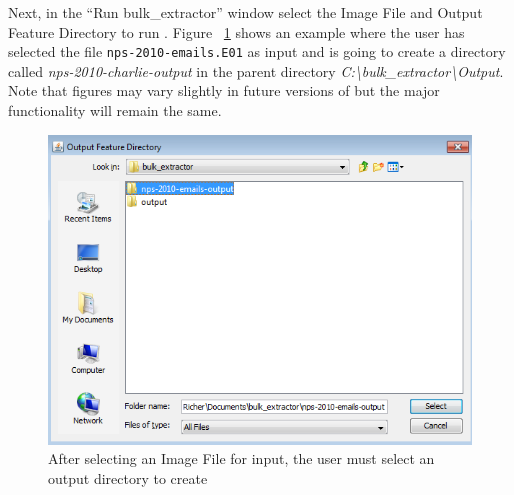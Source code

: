\documentclass[11pt]{article} %
\begin{document}
Next, in the ``Run bulk\_extractor'' window select the Image File and Output Feature Directory to run \bulk. Figure ~\ref{fig:selectOutputDirectory} shows an example where the user has selected the file \texttt{nps-2010-emails.E01} as input and is going to create a directory called \textit{nps-2010-charlie-output} in the parent directory \textit{C:\textbackslash bulk\_extractor\textbackslash Output}. Note that figures may vary slightly in future versions of \bulk but the major functionality will remain the same.\\
\begin{figure}
    \includegraphics[scale=.8]{viewerPics/selectOutputDirectory.png}
	\caption{After selecting an Image File for input, the user must select an output directory to create}
	\label{fig:selectOutputDirectory}
\end{figure}
 
\end{document}

